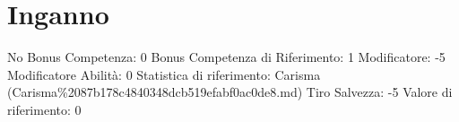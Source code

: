 \section{Inganno}\label{inganno}

\begin{description}
\tightlist
\item[Tags: ABI]
No Bonus Competenza: 0 Bonus Competenza di Riferimento: 1 Modificatore:
-5 Modificatore Abilità: 0 Statistica di riferimento: Carisma
(Carisma\%2087b178c4840348dcb519efabf0ac0de8.md) Tiro Salvezza: -5
Valore di riferimento: 0
\end{description}
